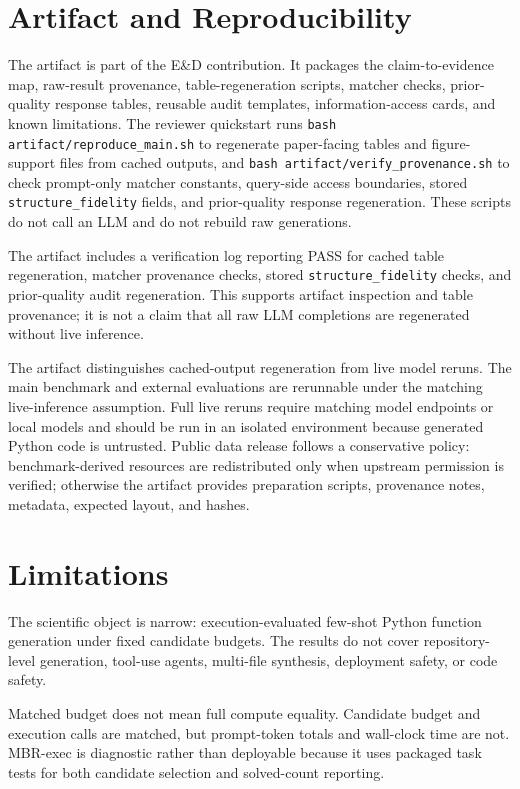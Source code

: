\documentclass{article}
\begin{document}
\section{Artifact and Reproducibility}
The artifact is part of the E\&D contribution. It packages the claim-to-evidence map, raw-result provenance, table-regeneration scripts, matcher checks, prior-quality response tables, reusable audit templates, information-access cards, and known limitations. The reviewer quickstart runs \texttt{bash artifact/reproduce\_main.sh} to regenerate paper-facing tables and figure-support files from cached outputs, and \texttt{bash artifact/verify\_provenance.sh} to check prompt-only matcher constants, query-side access boundaries, stored \texttt{structure\_fidelity} fields, and prior-quality response regeneration. These scripts do not call an LLM and do not rebuild raw generations.

The artifact includes a verification log reporting PASS for cached table regeneration, matcher provenance checks, stored \texttt{structure\_fidelity} checks, and prior-quality audit regeneration. This supports artifact inspection and table provenance; it is not a claim that all raw LLM completions are regenerated without live inference.

The artifact distinguishes cached-output regeneration from live model reruns. The main benchmark and external evaluations are rerunnable under the matching live-inference assumption. Full live reruns require matching model endpoints or local models and should be run in an isolated environment because generated Python code is untrusted. Public data release follows a conservative policy: benchmark-derived resources are redistributed only when upstream permission is verified; otherwise the artifact provides preparation scripts, provenance notes, metadata, expected layout, and hashes.

\section{Limitations}
The scientific object is narrow: execution-evaluated few-shot Python function generation under fixed candidate budgets. The results do not cover repository-level generation, tool-use agents, multi-file synthesis, deployment safety, or code safety.

Matched budget does not mean full compute equality. Candidate budget and execution calls are matched, but prompt-token totals and wall-clock time are not. MBR-exec is diagnostic rather than deployable because it uses packaged task tests for both candidate selection and solved-count reporting.
\end{document}
